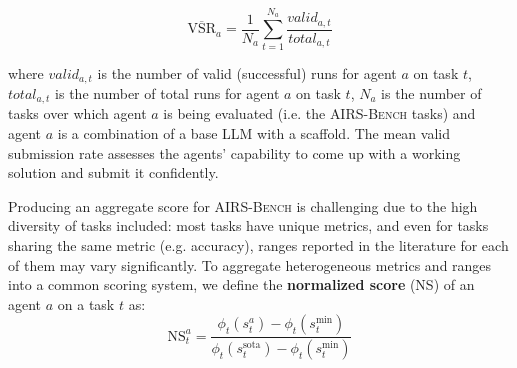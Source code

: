 \documentclass{fairmeta}
\newcommand{\airsbench}{\textsc{AIRS-Bench}}
\begin{document}
\begin{equation}
\overline{\text{VSR}}_a = \frac{1}{N_a} \sum_{t=1}^{N_a} \frac{valid_{a,t}}{total_{a,t}}
\label{eq:meanvalidrate}
\end{equation}

where $valid_{a,t}$ is the number of valid (successful) runs for agent $a$ on task $t$, $total_{a,t}$ is the number of total runs for agent $a$ on task $t$, $N_a$ is the number of tasks over which agent $a$ is being evaluated (i.e. the \airsbench{} tasks) and agent $a$ is a combination of a base LLM with a scaffold. The mean valid submission rate assesses the agents' capability to come up with a working solution and submit it confidently.


Producing an aggregate score for \airsbench{} is challenging due to the high diversity of tasks included: most tasks have unique metrics, and even for tasks sharing the same metric (e.g. accuracy), ranges reported in the literature for each of them may vary significantly. To aggregate heterogeneous metrics and ranges into a common scoring system, we define the \textbf{normalized score} (NS) of an agent $a$ on a task $t$ as:
\begin{equation}
    \text{NS}_{t}^a = \frac{\phi_t(s_{t}^a) - \phi_t(s^\mathrm{min}_t)}{\phi_t(s^\mathrm{sota}_t) - \phi_t(s^\mathrm{min}_t)}
    \label{eq:normscore}
\end{equation}
\end{document}
